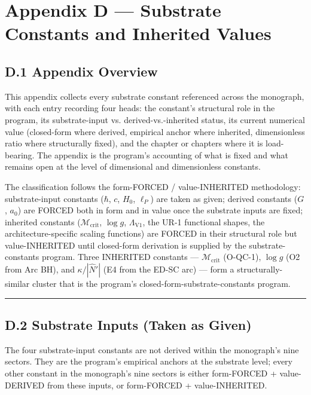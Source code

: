 \documentclass[11pt]{book}
\begin{document}
\newpage

\chapter{Appendix D --- Substrate Constants and Inherited Values}
\label{app:D}

\section{D.1 Appendix Overview}

This appendix collects every substrate constant referenced across the monograph, with each entry recording four heads: the constant's structural role in the program, its substrate-input vs. derived-vs.-inherited status, its current numerical value (closed-form where derived, empirical anchor where inherited, dimensionless ratio where structurally fixed), and the chapter or chapters where it is load-bearing. The appendix is the program's accounting of what is fixed and what remains open at the level of dimensional and dimensionless constants.

The classification follows the form-FORCED / value-INHERITED methodology: substrate-input constants ($\hbar$, $c$, $H_0$, $\ell_P$) are taken as given; derived constants ($G$, $a_0$) are FORCED both in form and in value once the substrate inputs are fixed; inherited constants ($\mathcal{M}_\mathrm{crit}$, $\log g$, $\Lambda_\mathrm{V1}$, the UR-1 functional shapes, the architecture-specific scaling functions) are FORCED in their structural role but value-INHERITED until closed-form derivation is supplied by the substrate-constants program. Three INHERITED constants — $\mathcal{M}_\mathrm{crit}$ (O-QC-1), $\log g$ (O2 from Arc BH), and $\kappa/|\hat{N}'|$ (E4 from the ED-SC arc) — form a structurally-similar cluster that is the program's closed-form-substrate-constants program.

\bigskip\hrule\bigskip

\section{D.2 Substrate Inputs (Taken as Given)}

The four substrate-input constants are not derived within the monograph's nine sectors. They are the program's empirical anchors at the substrate level; every other constant in the monograph's nine sectors is either form-FORCED + value-DERIVED from these inputs, or form-FORCED + value-INHERITED.
\end{document}
